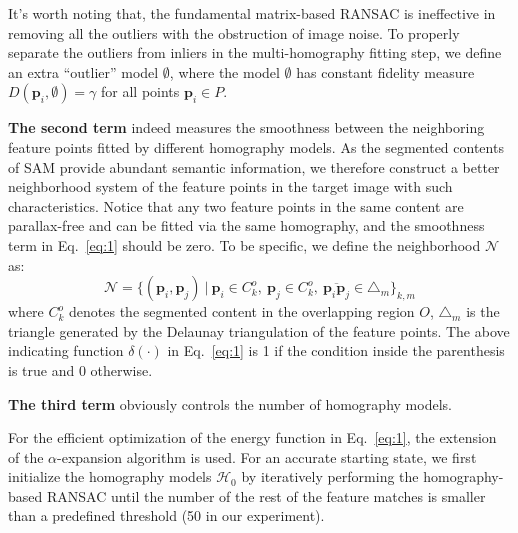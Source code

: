 \documentclass[10pt,twocolumn,letterpaper]{article}
\begin{document}
It's worth noting that, the fundamental matrix-based RANSAC is ineffective in removing all the outliers with the obstruction of image noise. 
To properly separate the outliers from inliers in the multi-homography fitting step,
we define an extra ``outlier'' model $\emptyset$, where the model $\emptyset$ has constant fidelity measure $D(\mathbf{p}_i, \emptyset)=\gamma$ for all points $\mathbf{p}_i \in P$. 

\noindent\textbf{The second term} indeed measures the smoothness between the neighboring feature points fitted by different homography models. As the segmented contents of SAM provide abundant semantic information, we therefore construct a better neighborhood system of the feature points in the target image with such characteristics. Notice that any two feature points in the same content are parallax-free and can be fitted via the same homography, and the smoothness term in Eq.~\ref{eq:1} should be zero. To be specific, we define the neighborhood $\mathcal{N}$ as:
\begin{equation}
	\mathcal{N}=\{(\mathbf{p}_i, \mathbf{p}_j)\ |\ \mathbf{p}_i\in C_k^o,\ \mathbf{p}_j\in C_k^o,\ \overline{\mathbf{p}_i \mathbf{p}_j}\in \triangle_m\}_{k,m}
\end{equation}
where $C_k^o$ denotes the segmented content in the overlapping region $O$, $\triangle_m$ is the triangle generated by the Delaunay triangulation of the feature points. The above indicating function $\delta(\cdot)$ in Eq.~\ref{eq:1} is 1 if the condition inside the parenthesis is true and 0 otherwise.

\noindent\textbf{The third term} obviously controls the number of homography models.


For the efficient optimization of the energy function in Eq.~\ref{eq:1}, the extension of the $\alpha$-expansion algorithm \cite{delong2012fast} is used.
For an accurate starting state, we first initialize the homography models $\mathcal{H}_0$ by iteratively performing the homography-based RANSAC until the number of the rest of the feature matches is smaller than a predefined threshold (50 in our experiment).
\end{document}
